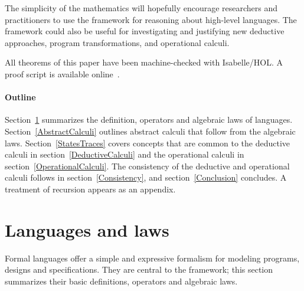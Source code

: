 \documentclass[a4paper,leqno]{llncs}
\begin{document}
The simplicity of the mathematics will hopefully encourage researchers and practitioners to use the framework for reasoning about high-level languages. The framework could also be useful for investigating and justifying new deductive approaches, program transformations, and operational calculi.

All theorems of this paper have been machine-checked with Isabelle/HOL. A proof script is available online~\cite{onlineproofsAFrameworkForConcurrentImperativeProgramming}.

\paragraph{Outline} Section~\ref{LanguagesAndLaws} summarizes the definition, operators and algebraic laws of languages. Section~\ref{AbstractCalculi} outlines abstract calculi that follow from the algebraic laws. Section~\ref{StatesTraces} covers concepts that are common to the deductive calculi in section~\ref{DeductiveCalculi} and the operational calculi in section~\ref{OperationalCalculi}. The consistency of the deductive and operational calculi follows in section~\ref{Consistency}, and section~\ref{Conclusion} concludes. A treatment of recursion appears as an appendix.

\section{Languages and laws}\label{LanguagesAndLaws}
Formal languages offer a simple and expressive formalism for modeling programs, designs and specifications. They are central to the framework; this section summarizes their basic definitions, operators and algebraic laws. 
\end{document}
